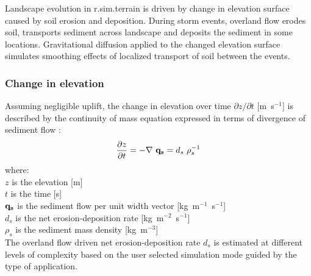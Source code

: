 \documentclass[gmd, manuscript]{copernicus}
\begin{document}
Landscape evolution in r.sim.terrain 
is driven by change in elevation surface caused by soil erosion and deposition.
During storm events, overland flow erodes soil, transports sediment across landscape and 
deposits the sediment in some locations. Gravitational diffusion applied to the changed elevation
surface simulates smoothing effects of localized transport of soil between the events.

\subsubsection{Change in elevation} 

Assuming negligible uplift, the change in elevation over time 
${\partial z / \partial t}$ [\unit{m~s}$^{-1}$] 
is described by the continuity of mass equation expressed in terms of divergence 
of sediment flow  \citep{Tucker2001}:
\begin{equation}
\label{eq:evolution} 
{\partial z \over \partial t } = -\nabla~{\bf q_s} = d_s ~ \rho_s^{-1} 
\end{equation}
{\small
where: \\
\noindent
\hspace*{0.5em} $z$ is the elevation [\unit{m}] \\
\hspace*{0.5em} $t$ is the time [\unit{s}] \\
\hspace*{0.5em} ${\bf q_s}$ is the sediment flow per unit width vector [\unit{kg~m}$^{-1}$~\unit{s}$^{-1}$]\\
\hspace*{0.5em} $d_s$ is the net erosion-deposition rate [\unit{kg~m}$^{-2}$~\unit{s}$^{-1}$]\\
\hspace*{0.5em} $\rho_s$ is the sediment mass density [\unit{kg~m}$^{-3}$]\\
}
The overland flow driven net erosion-deposition rate $d_s$ 
 is estimated at different levels of complexity based 
on the user selected simulation mode guided by the type of application.
\end{document}
